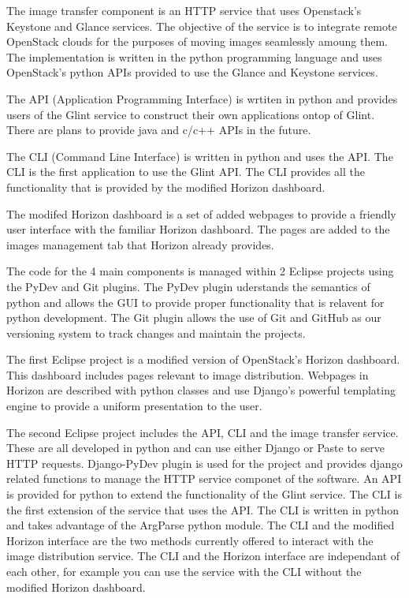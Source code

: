 \documentclass[a4paper]{jpconf}
\begin{document}
The image transfer component is an HTTP service that uses Openstack's Keystone and Glance services. The objective of the service is to integrate remote OpenStack clouds for the purposes of moving images seamlessly amoung them. The implementation is written in the python programming language and uses OpenStack's python APIs provided to use the Glance and Keystone services.

The API (Application Programming Interface) is wrtiten in python and provides users of the Glint service to construct their own applications ontop of Glint. There are plans to provide java and c/c++ APIs in the future.

The CLI (Command Line Interface) is written in python and uses the API. The CLI is the first application to use the Glint API. The CLI provides all the functionality that is provided by the modified Horizon dashboard.

The modifed Horizon dashboard is a set of added webpages to provide a friendly user interface with the familiar Horizon dashboard. The pages are added to the images management tab that Horizon already provides. 

The code for the 4 main components is managed within 2 Eclipse projects using the PyDev and Git plugins. The PyDev plugin uderstands the semantics of python and allows the GUI to provide proper functionality that is relavent for python development. The Git plugin allows the use of Git and GitHub as our versioning system to track changes and maintain the projects. 

The first Eclipse project is a modified version of OpenStack's Horizon dashboard. This dashboard includes pages relevant to image distribution. Webpages in Horizon are described with python classes and use Django's powerful templating engine to provide a uniform presentation to the user. 

The second Eclipse project includes the API, CLI and the image transfer service. These are all developed in python and can use either Django or Paste to serve HTTP requests. Django-PyDev plugin is used for the project and provides django related functions to manage the HTTP service componet of the software. An API is provided for python to extend the functionality of the Glint service. The CLI is the first extension of the service that uses the API. The CLI is written in python and takes advantage of the ArgParse python module. The CLI and the modified Horizon interface are the two methods currently offered to interact with the image distribution service. The CLI and the Horizon interface are independant of each other, for example you can use the service with the CLI without the modified Horizon dashboard.
\end{document}
